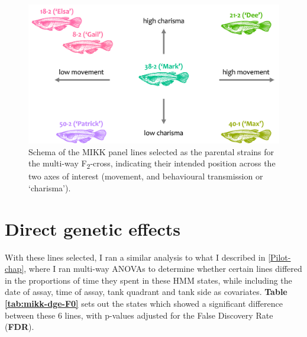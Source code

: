 \documentclass[
]{book}
\begin{document}
\begin{figure}
\includegraphics[width=1\linewidth]{figs/mikk_behaviour/line_selection_schema} \caption{Schema of the MIKK panel lines selected as the parental strains for the multi-way F\textsubscript{2}-cross, indicating their intended position across the two axes of interest (movement, and behavioural transmission or `charisma').}\label{fig:F0-line-select-schema}
\end{figure}

\clearpage

\hypertarget{direct-genetic-effects-1}{%
\section{Direct genetic effects}\label{direct-genetic-effects-1}}

With these lines selected, I ran a similar analysis to what I described in \ref{Pilot-chap}, where I ran multi-way ANOVAs to determine whether certain lines differed in the proportions of time they spent in these HMM states, while including the date of assay, time of assay, tank quadrant and tank side as covariates. \textbf{Table \ref{tab:mikk-dge-F0}} sets out the states which showed a significant difference between these 6 lines, with p-values adjusted for the False Discovery Rate (\textbf{FDR}).
\end{document}
